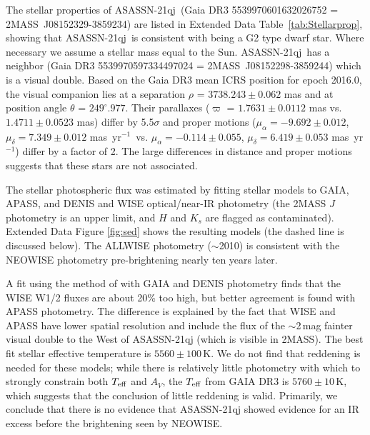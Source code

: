 \documentclass[sn-nature,oneside]{sn-jnl}%
\newcommand{\asas}{ASASSN-21qj}
\newcommand{\masyr}{mas~yr$^{-1}$}
\begin{document}
The stellar properties of \asas\ (Gaia DR3 5539970601632026752 = 2MASS~J08152329-3859234) are listed in Extended Data Table~\ref{tab:Stellarprop}, showing that \asas\ is consistent with being a G2 type dwarf star.
%
Where necessary we assume a stellar mass equal to the Sun.
%
\asas\  has a neighbor (Gaia DR3 5539970597334497024 = 2MASS~J08152298-3859244) which is a visual double.
%
Based on the Gaia DR3 mean ICRS position for epoch 2016.0, the visual companion lies at a separation $\rho$ = $3738.243\pm0.062$ mas and at position angle $\theta$ = $249^{\circ}.977$.
%
Their parallaxes ($\varpi$ = $1.7631\pm0.0112$ mas vs. $1.4711\pm0.0523$ mas) differ by 5.5$\sigma$ and proper motions ($\mu_{\alpha} = -9.692\pm0.012$, $\mu_{\delta} = 7.349\pm0.012$ \masyr\, vs. $\mu_{\alpha} = -0.114\pm0.055$, $\mu_{\delta} = 6.419\pm0.053$ \masyr) differ by a factor of 2.
%
The large differences in distance and proper motions suggests that these stars are not associated.

The stellar photospheric flux was estimated by fitting stellar models to GAIA, APASS, and DENIS and WISE optical/near-IR photometry (the 2MASS $J$ photometry is an upper limit, and $H$ and $K_s$ are flagged as contaminated).
%
Extended Data Figure \ref{fig:sed} shows the resulting models (the dashed line is discussed below).
%
The ALLWISE photometry ($\sim$2010) is consistent with the NEOWISE photometry pre-brightening nearly ten years later.
%

A fit using the method of \cite{2019MNRAS.488.3588Y} with GAIA and DENIS photometry finds that the WISE W1/2 fluxes are about 20\% too high, but better agreement is found with APASS photometry.
%
The difference is explained by the fact that WISE and APASS have lower spatial resolution and include the flux of the $\sim$2\,mag fainter visual double to the West of \asas{} (which is visible in 2MASS).
%
The best fit stellar effective temperature is $5560 \pm 100$\,K.
%
We do not find that reddening is needed for these models; while there is relatively little photometry with which to strongly constrain both $T_{\rm eff}$ and $A_V$, the $T_{\rm eff}$ from GAIA DR3 is $5760 \pm 10$\,K, which suggests that the conclusion of little reddening is valid.
%
Primarily, we conclude that there is no evidence that \asas{} showed evidence for an IR excess before the brightening seen by NEOWISE.
\end{document}

